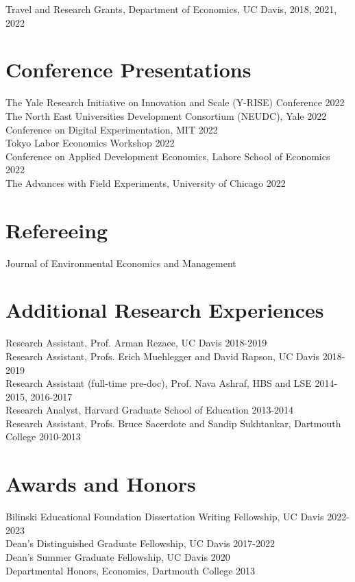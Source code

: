 \documentclass[10pt]{res} %
\begin{document}
\begin{resume}
\hangindent=0.7cm  Travel and Research Grants, Department of Economics, UC Davis,  \hfill 2018, 2021, 2022


\section{Conference Presentations}
The Yale Research Initiative on Innovation and Scale (Y-RISE) Conference  \hfill 2022 \\
The North East Universities Development Consortium (NEUDC), Yale \hfill 2022 \\
Conference on Digital Experimentation, MIT \hfill 2022 \\
Tokyo Labor Economics Workshop \hfill 2022 \\
Conference on Applied Development Economics, Lahore School of Economics \hfill 2022 \\
The Advances with Field Experiments, University of Chicago \hfill 2022 

\section{Refereeing}
Journal of Environmental Economics and Management

\section{Additional Research Experiences}
Research Assistant, Prof. Arman Rezaee, UC Davis \hfill 2018-2019 \\
Research Assistant, Profs. Erich Muehlegger and David Rapson, UC Davis \hfill 2018-2019 \\
Research Assistant (full-time pre-doc), Prof. Nava Ashraf, HBS and LSE \hfill 2014-2015, 2016-2017 \\
Research Analyst, Harvard Graduate School of Education  \hfill  2013-2014 \\
Research Assistant, Profs. Bruce Sacerdote and Sandip Sukhtankar, Dartmouth College \hfill 2010-2013

\section{Awards and Honors} 
Bilinski Educational Foundation Dissertation Writing Fellowship, UC Davis   \hfill 2022-2023  \\
Dean's Distinguished Graduate Fellowship, UC Davis \hfill 2017-2022  \\
Dean's Summer Graduate Fellowship, UC Davis \hfill 2020 \\
Departmental Honors, Economics, Dartmouth College \hfill 2013 \\





\end{resume}
\end{document}
